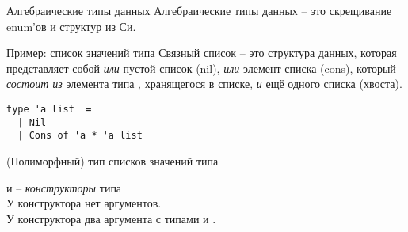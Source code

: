 \documentclass[aspectratio=169
  , xcolor={svgnames}
  , hyperref=
      { colorlinks
      , urlcolor=DarkBlue
      }
  , russian  %
  ]{beamer}
\begin{document}
\begin{frame}[fragile]{Алгебраические типы данных}
Алгебраические типы данных -- это скрещивание enum'ов и структур из Си.
\begin{block}{Пример: список значений типа }
Связный список -- это структура данных, которая представляет собой \emph{\underline{или}}
пустой список (nil), \emph{\underline{или}} элемент списка (cons), который \emph{\underline{состоит из}} элемента типа , хранящегося в списке, \emph{\underline{и}} ещё одного списка (хвоста).
\end{block}
\vspace{1em}

\begin{minipage}{0.45\linewidth}
\begin{verbatim}
type 'a list  =
  | Nil
  | Cons of 'a * 'a list
\end{verbatim}
(Полиморфный) тип  списков значений типа 
\end{minipage}\hspace{1cm}
\begin{minipage}{0.45\linewidth}
 и   -- \emph{конструкторы} типа \\

У конструктора   нет аргументов.\\

У конструктора   два  аргумента с типами  и  .\\
\end{minipage}
\end{frame}
\end{document}
